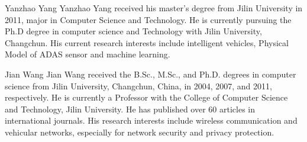 \documentclass[journal]{IEEEtran}
\begin{document}
	\begin{IEEEbiography}{Yanzhao Yang}
		Yanzhao Yang received his master's degree from Jilin University in 2011, major in Computer Science and Technology. He is currently pursuing the Ph.D degree in computer science and Technology with Jilin University, Changchun. His current research interests include intelligent vehicles, Physical Model of ADAS sensor and machine learning.\end{IEEEbiography}
	

	\begin{IEEEbiography}{Jian Wang}
		Jian Wang received the B.Sc., M.Sc., and Ph.D.
		degrees in computer science from Jilin University,
		Changchun, China, in 2004, 2007, and 2011, respectively.
		He is currently a Professor with the College of
		Computer Science and Technology, Jilin University.
		He has published over 60 articles in international
		journals. His research interests include wireless communication
		and vehicular networks, especially for
		network security and privacy protection.\end{IEEEbiography}
\end{document}
